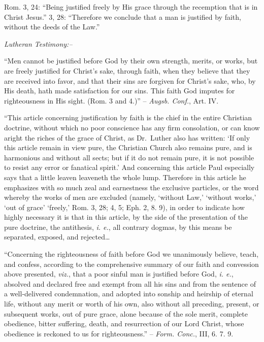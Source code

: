 \documentclass[
]{book}
\begin{document}
Rom. 3, 24: ``Being justified freely by His grace through the recemption that is in Christ Jesus.'' 3, 28: ``Therefore we conclude that a man is justified by faith, without the deeds of the Law.''

\begin{center}
\textsl{Lutheran Testimony:--}
\end{center}

``Men cannot be justified before God by their own strength, merits, or works, but are freely justified for Christ's sake, through faith, when they believe that they are received into favor, and that their sins are forgiven for Christ's sake, who, by His death, hath made satisfaction for our sins. This faith God imputes for righteousness in His sight. (Rom. 3 and 4.)'' -- \emph{Augsb. Conf.}, Art. IV.

``This article concerning justification by faith is the chief in the entire Christian doctrine, without which no poor conscience has any firm consolation, or can know aright the riches of the grace of Christ, as Dr.~Luther also has written: `If only this article remain in view pure, the Christian Church also remains pure, and is harmonious and without all sects; but if it do not remain pure, it is not possible to resist any error or fanatical spirit.' And concerning this article Paul especially says that a little leaven leaveneth the whole lump. Therefore in this article he emphasizes with so much zeal and earnestness the exclusive particles, or the word whereby the works of men are excluded (namely, `without Law,' `without works,' `out of grace' `freely,' Rom. 3, 28; 4, 5; Eph. 2, 8. 9), in order to indicate how highly necessary it is that in this article, by the side of the presentation of the pure doctrine, the antithesis, \emph{i. e.}, all contrary dogmas, by this means be separated, exposed, and rejected\ldots{}

``Concerning the righteousness of faith before God we unanimously believe, teach, and confess, according to the comprehensive summary of our faith and convession above presented, \emph{viz.}, that a poor sinful man is justified before God, \emph{i. e.}, absolved and declared free and exempt from all his sins and from the sentence of a well-delivered condemnation, and adopted into sonship and heirship of eternal life, without any merit or worth of his own, also without all preceding, present, or subsequent works, out of pure grace, alone because of the sole merit, complete obedience, bitter suffering, death, and resurrection of our Lord Christ, whose obedience is reckoned to us for righteousness.'' -- \emph{Form. Conc.}, III, 6. 7. 9.
\end{document}
